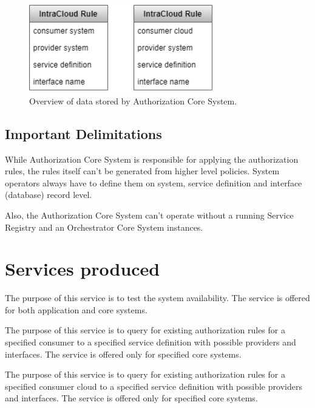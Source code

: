 \documentclass[a4paper]{arrowhead}
\begin{document}
\begin{figure}[h!]
  \centering
  \includegraphics[width=8cm]{figures/authorization_data_overview.png}
  \caption{
    Overview of data stored by Authorization Core System.
  }
  \label{fig:information_overview}
\end{figure}

\subsection{Important Delimitations}
\label{sec:delimitations}

While Authorization Core System is responsible for applying the authorization rules, the rules itself can't be generated from higher level policies. System operators always have to define them on system, service definition and interface (database) record level. 

Also, the Authorization Core System can't operate without a running Service Registry and an Orchestrator Core System instances.

\newpage

\section{Services produced}
\label{sec:services}

The purpose of this service is to test the system availability. The service is offered for both application and core systems. 

The purpose of this service is to query for existing authorization rules for a specified consumer to a specified service definition with possible providers and interfaces. The service is offered only for specified core systems.

The purpose of this service is to query for existing authorization rules for a specified consumer cloud to a specified service definition with possible providers and interfaces. The service is offered only for specified core systems.
\end{document}
